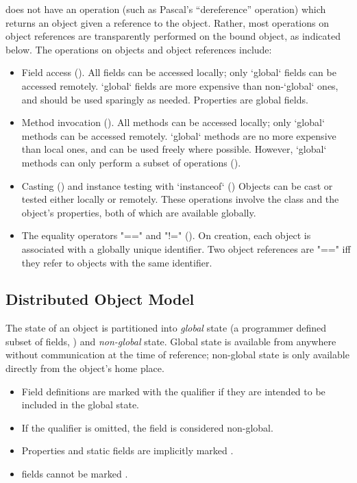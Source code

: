 {}\Xten{} does not have an operation (such as Pascal's ``dereference''
operation) which returns an object given a reference to the
object. Rather, most operations on object references are transparently
performed on the bound object, as indicated below. The operations on
objects and object references include:
\begin{itemize}

{}\item Field access (). 
All fields can be accessed locally; only \xcd`global` fields can be accessed
remotely.   \xcd`global` fields are more expensive than non-\xcd`global` ones,
and should be used sparingly as needed.  Properties are global fields.

{}\item Method invocation ().  
\label{GlobalAnnotation}
All methods can be accessed locally; only \xcd`global` methods can be accessed
remotely.  \xcd`global` methods are no more expensive than local ones, and can
be used freely where possible.  However, \xcd`global` methods can only perform
a subset of operations ().

{}\item Casting () and instance testing with \xcd`instanceof`
() Objects can be cast or tested either locally or remotely.
These operations involve the class and the object's properties, both of which
are available globally.

\item The equality operators \xcd"==" and \xcd"!="
(). On creation, each object is associated with a globally
unique identifier. Two object references are \xcd"==" iff they refer to objects
with the same identifier.

\end{itemize}

\subsection{Distributed Object Model}

The state of an object is partitioned into \emph{global} state (a
programmer defined subset of  fields, ) and
\emph{non-global} state.  Global state is available from anywhere without
communication at the time of reference; non-global state is only available
directly from the object's home place. 

 \begin{itemize}
\item Field definitions are marked with the qualifier  if
  they are intended to be included in the global state.
\item If the  qualifier is omitted, the field is
  considered non-global.
\item Properties and static fields are implicitly marked .
\item {} fields cannot be marked .
\end{itemize}
 

